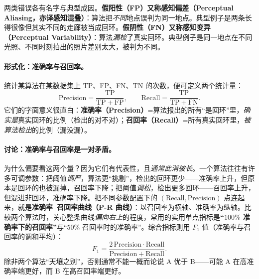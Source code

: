 \noindent 两类错误各有名字与典型成因\cite{gaoxiang2019slam14}。\textbf{假阳性（FP）又称感知偏差（Perceptual Aliasing，亦译感知混叠）}：算法把\emph{不同}地点误判为同一地点。典型例子是两条长得很像但其实不同的走廊被当成回环。\textbf{假阴性（FN）又称感知变异（Perceptual Variability）}：算法\emph{漏检}了真实回环。典型例子是同一地点在不同光照、不同时刻拍出的照片差别太大，被判为不同。

\paragraph{形式化：准确率与召回率。}
统计某算法在某数据集上 TP、FP、FN、TN 的次数，便可定义两个统计量\cite{gaoxiang2019slam14}：
\begin{equation}
  \mathrm{Precision}=\frac{\mathrm{TP}}{\mathrm{TP}+\mathrm{FP}},\qquad
  \mathrm{Recall}=\frac{\mathrm{TP}}{\mathrm{TP}+\mathrm{FN}}.
  \label{eq:loop-pr}
\end{equation}
它们的字面意义很直白：\textbf{准确率（Precision）}=算法报出的所有“是回环”里，\emph{确实是}真实回环的比例（检出的对不对）；\textbf{召回率（Recall）}=所有真实回环里，\emph{被算法检出}的比例（漏没漏）。

\paragraph{讨论：准确率与召回率是一对矛盾。}
为什么偏要看这两个量？因为它们有代表性，且\emph{通常此消彼长}\cite{gaoxiang2019slam14}。一个算法往往有许多可调参数：把阈值\emph{调严}，算法更“挑剔”，检出的回环更少——准确率上升，但原本是回环的也被漏掉，召回率下降；把阈值\emph{调松}，检出更多回环——召回率上升，但混进非回环，准确率下降。把不同参数配置下的 $(\mathrm{Recall},\mathrm{Precision})$ 点连起来，就是\textbf{准确率--召回率曲线（P-R 曲线）}：以召回率为横轴、准确率为纵轴。比较两个算法时，关心整条曲线\emph{偏向右上}的程度，常用的实用单点指标是\textbf{“$100\%$ 准确率下的召回率”}与“$50\%$ 召回率时的准确率”。综合指标则用 $F_1$ 值（准确率与召回率的调和平均）：
\begin{equation}
  F_1=\frac{2\,\mathrm{Precision}\cdot\mathrm{Recall}}{\mathrm{Precision}+\mathrm{Recall}}.
  \label{eq:loop-f1}
\end{equation}
除非两个算法“天壤之别”，否则通常不能一概而论说 A 优于 B——可能 A 在高准确率端更好，而 B 在高召回率端更好。

